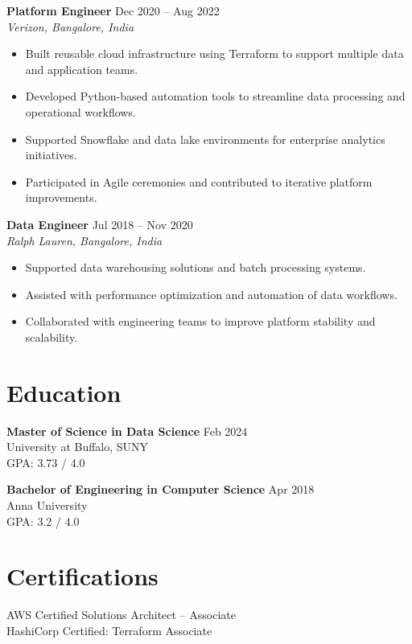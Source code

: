 \documentclass[10pt]{article}
\begin{document}
\textbf{Platform Engineer} \hfill Dec 2020 -- Aug 2022 \\
\textit{Verizon, Bangalore, India}
\begin{itemize}[leftmargin=*, itemsep=3pt]
    \item Built reusable cloud infrastructure using Terraform to support multiple data and application teams.
    \item Developed Python-based automation tools to streamline data processing and operational workflows.
    \item Supported Snowflake and data lake environments for enterprise analytics initiatives.
    \item Participated in Agile ceremonies and contributed to iterative platform improvements.
\end{itemize}

\textbf{Data Engineer} \hfill Jul 2018 -- Nov 2020 \\
\textit{Ralph Lauren, Bangalore, India}
\begin{itemize}[leftmargin=*, itemsep=3pt]
    \item Supported data warehousing solutions and batch processing systems.
    \item Assisted with performance optimization and automation of data workflows.
    \item Collaborated with engineering teams to improve platform stability and scalability.
\end{itemize}

\section*{Education}

\textbf{Master of Science in Data Science} \hfill Feb 2024 \\
University at Buffalo, SUNY \\
GPA: 3.73 / 4.0

\textbf{Bachelor of Engineering in Computer Science} \hfill Apr 2018 \\
Anna University \\
GPA: 3.2 / 4.0

\section*{Certifications}
AWS Certified Solutions Architect – Associate \\
HashiCorp Certified: Terraform Associate
\end{document}
